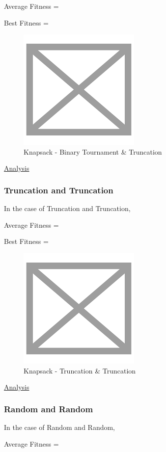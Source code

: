 \documentclass[11pt, letterpaper]{article}
\begin{document}
Average Fitness = 

Best Fitness = 
\begin{figure}[h]
    \centering
    \includegraphics[scale = 0.6]{images/placeHolder.png}
    \caption {Knapsack - Binary Tournament \& Truncation}
    \label {fig:kpBT}
\end{figure}

\underline{Analysis}

\subsubsection {Truncation and Truncation}
In the case of Truncation and Truncation,

Average Fitness = 

Best Fitness = 
\begin{figure}[H]
    \centering
    \includegraphics[scale = 0.6]{images/placeHolder.png}
    \caption {Knapsack - Truncation \& Truncation}
    \label {fig:kpTT}
\end{figure}

\underline{Analysis}
\subsubsection {Random and Random}
In the case of Random and Random,

Average Fitness = 
\end{document}

